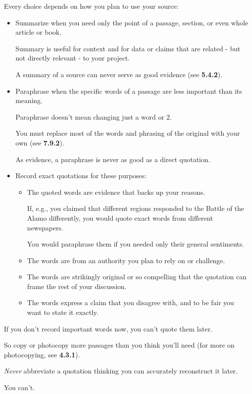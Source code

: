 \documentclass[oneside]{book}
\numberwithin{equation}{section}
\begin{document}
Every choice depends on how you plan to use your source:
\begin{itemize}
    \item Summarize when you need only the point of a passage, section, or even whole article or book.
    
    Summary is useful for context and for data or claims that are related - but not directly relevant - to your project.
    
    A summary of a source can never serve as good evidence (see \textbf{5.4.2}).
    \item Paraphrase when the specific words of a passage are less important than its meaning.
    
    Paraphrase doesn't mean changing just a word or 2.
    
    You must replace most of the words and phrasing of the original with your own (see \textbf{7.9.2}).
    
    As evidence, a paraphrase is never as good as a direct quotation.
    \item Record exact quotations for these purposes:
    \begin{itemize}
        \item The quoted words are evidence that backs up your reasons.
        
        If, e.g., you claimed that different regions responded to the Battle of the Alamo differently, you would quote exact words from different newspapers.
        
        You would paraphrase them if you needed only their general sentiments.
        \item The words are from an authority you plan to rely on or challenge.
        \item The words are strikingly original or so compelling that the quotation can frame the rest of your discussion.
        \item The words express a claim that you disagree with, and to be fair you want to state it exactly.
    \end{itemize}
\end{itemize}
If you don't record important words now, you can't quote them later.

So copy or photocopy more passages than you think you'll need (for more on photocopying, see \textbf{4.3.1}).

%
\textit{Never} abbreviate a quotation thinking you can accurately reconstruct it later.

You can't.
\end{document}

